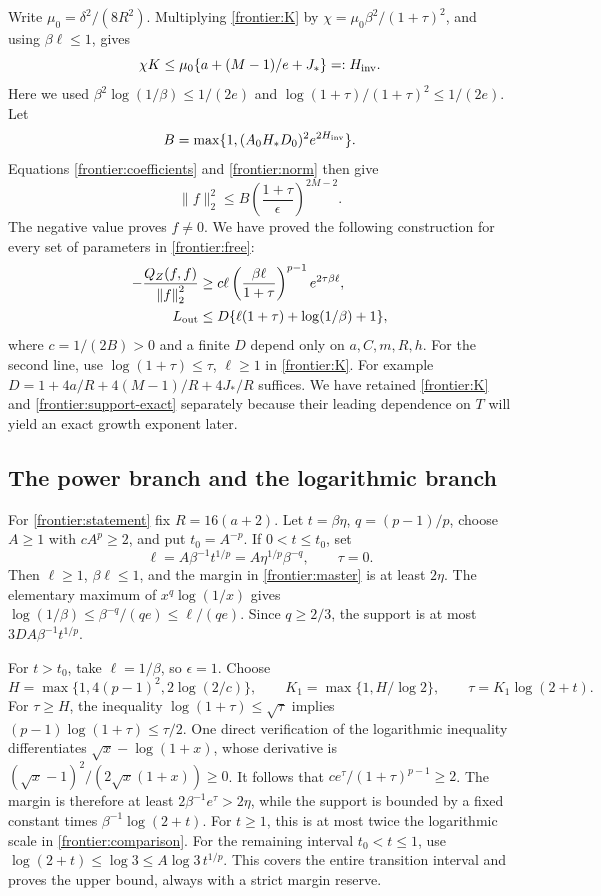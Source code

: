 Write \(\mu_0=\delta^2/(8R^2)\). Multiplying
\eqref{frontier:K} by \(\chi=\mu_0\beta^2/(1+\tau)^2\),
and using \(\beta\ell\le1\), gives
\[
 \chi K\le\mu_0\{a+(M-1)/e+J_*\}=:H_{\rm inv}.
\]
Here we used \(\beta^2\log(1/\beta)\le1/(2e)\) and
\(\log(1+\tau)/(1+\tau)^2\le1/(2e)\).
Let
\[
 B=\max\{1,(A_0H_*D_0)^2e^{2H_{\rm inv}}\}.
\]
Equations \eqref{frontier:coefficients} and \eqref{frontier:norm}
then give
\[
 \|f\|_2^2\le B\left(\frac{1+\tau}{\epsilon}\right)^{2M-2}.
\]
The negative value proves \(f\ne0\). We have proved the following
construction for every set of parameters in \eqref{frontier:free}:
\begin{equation}\label{frontier:master}
 \begin{split}
 -\frac{Q_Z(f,f)}{\left\|f\right\|_2^2}
 &\ge c\ell\left(\frac{\beta\ell}{1+\tau}\right)^{p-1}
                      e^{2\tau\beta\ell},\\
 L_{\rm out}&\le D\{\ell(1+\tau)+\log(1/\beta)+1\},
 \end{split}
\end{equation}
where \(c=1/(2B)>0\) and a finite \(D\) depend only on
\(a,C,m,R,h\). For the second line, use
\(\log(1+\tau)\le\tau\), \(\ell\ge1\) in
\eqref{frontier:K}. For example
\(D=1+4a/R+4(M-1)/R+4J_*/R\) suffices. We have retained
\eqref{frontier:K} and \eqref{frontier:support-exact} separately
because their leading dependence on \(T\) will yield an exact
growth exponent later.

\subsection{The power branch and the logarithmic branch}
For \eqref{frontier:statement} fix \(R=16(a+2)\). Let
\(t=\beta\eta\), \(q=(p-1)/p\), choose \(A\ge1\) with
\(cA^p\ge2\), and put \(t_0=A^{-p}\).
If \(0<t\le t_0\), set
\[
 \ell=A\beta^{-1}t^{1/p}=A\eta^{1/p}\beta^{-q},\qquad\tau=0.
\]
Then \(\ell\ge1\), \(\beta\ell\le1\), and the margin in
\eqref{frontier:master} is at least \(2\eta\).
The elementary maximum of \(x^q\log(1/x)\) gives
\(\log(1/\beta)\le\beta^{-q}/(qe)\le\ell/(qe)\).
Since \(q\ge2/3\), the support is at most
\(3DA\beta^{-1}t^{1/p}\).

For \(t>t_0\), take \(\ell=1/\beta\), so \(\epsilon=1\).
Choose
\[
 H=\max\{1,4(p-1)^2,2\log(2/c)\},\qquad
 K_1=\max\{1,H/\log2\},\qquad \tau=K_1\log(2+t).
\]
For \(\tau\ge H\), the inequality
\(\log(1+\tau)\le\sqrt\tau\) implies
\((p-1)\log(1+\tau)\le\tau/2\). One direct verification
of the logarithmic inequality differentiates
\(\sqrt x-\log(1+x)\), whose derivative is
\((\sqrt x-1)^2/(2\sqrt x(1+x))\ge0\).
It follows that \(ce^\tau/(1+\tau)^{p-1}\ge2\).
The margin is therefore at least
\(2\beta^{-1}e^\tau>2\eta\), while the support is bounded by
a fixed constant times \(\beta^{-1}\log(2+t)\).
For \(t\ge1\), this is at most twice the logarithmic scale in
\eqref{frontier:comparison}. For the remaining interval
\(t_0<t\le1\), use
\(\log(2+t)\le\log3\le A\log3\,t^{1/p}\).
This covers the entire transition interval and proves the upper
bound, always with a strict margin reserve.

